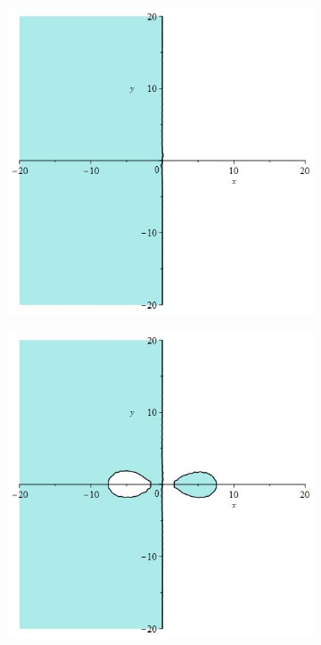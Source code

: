 \documentclass[12pt]{article}
\begin{document}
\begin{figure}[H]
    \begin{subfigure}{0.24\textwidth}
        \includegraphics[width=0.9\linewidth]{stabrks3_85i.jpg}
    \end{subfigure}
    \begin{subfigure}{0.24\textwidth}
        \includegraphics[width=0.9\linewidth]{stabrks3_9i.jpg}

\end{subfigure}
\end{figure}
\end{document}
